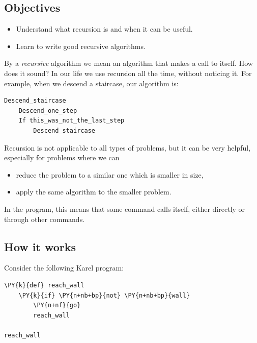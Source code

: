 \subsection{Objectives} 
 
\begin{itemize}
\item Understand what recursion is and when it can be useful.
\item Learn to write good recursive algorithms.
\end{itemize}
By a {\em recursive} algorithm we mean an algorithm that makes a call to itself. How does it sound?
In our life we use recursion all the time, without noticing it. For example, when we descend 
a staircase, our algorithm is:\\

\begin{bbox}
\begin{Verbatim}[commandchars=\\\{\}]
Descend_staircase
    Descend_one_step
    If this_was_not_the_last_step
        Descend_staircase
\end{Verbatim}
\end{bbox}
\vspace{6mm}

\noindent
Recursion is not applicable to all types of problems, but it can be very 
helpful, especially for problems where we can
\begin{itemize}
\item reduce the problem to a similar one which is smaller in size, 
\item apply the same algorithm to the smaller problem. 
\end{itemize}
In the program, this means that some command calls itself, either 
directly or through other commands.

\subsection[\ \ How it works]{How it works} 

Consider the following Karel program:\\

\begin{bbox}
\begin{Verbatim}[commandchars=\\\{\}]
\PY{k}{def} reach_wall
    \PY{k}{if} \PY{n+nb+bp}{not} \PY{n+nb+bp}{wall}
        \PY{n+nf}{go}
        reach_wall

reach_wall
\end{Verbatim}
\end{bbox}
\vspace{6mm}

